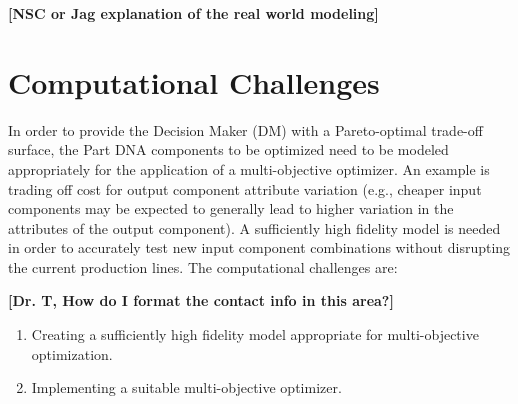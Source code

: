 \documentclass{IEEEtran}
\begin{document}
\textbf{[NSC or Jag explanation of the real world modeling]}

\section{Computational Challenges}
In order to provide the Decision Maker (DM) with a Pareto-optimal trade-off surface, the Part DNA components to be optimized need to be modeled appropriately for the application of a multi-objective optimizer. An example is trading off cost for output component attribute variation (e.g., cheaper input components may be expected to generally lead to higher variation in the attributes of the output component). A sufficiently high fidelity model is needed in order to accurately test new input component combinations without disrupting the current production lines. The computational challenges are:

\textbf{[Dr. T,  How do I format the contact info in this area?]}

\begin{enumerate}
\item Creating a sufficiently high fidelity model appropriate for multi-objective optimization.
\item Implementing a suitable multi-objective optimizer.
\end{enumerate}
\end{document}
